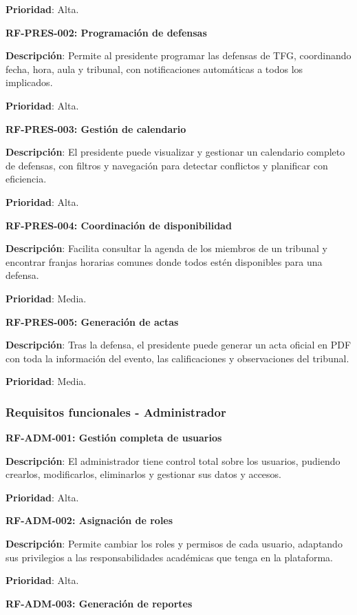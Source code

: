 \documentclass[12pt,a4paper,oneside]{report}
\begin{document}
\textbf{Prioridad}: Alta.

\textbf{RF-PRES-002: Programación de defensas}

\textbf{Descripción}: Permite al presidente programar las defensas de TFG, coordinando fecha, hora, aula y tribunal, con notificaciones automáticas a todos los implicados.

\textbf{Prioridad}: Alta.

\textbf{RF-PRES-003: Gestión de calendario}

\textbf{Descripción}: El presidente puede visualizar y gestionar un calendario completo de defensas, con filtros y navegación para detectar conflictos y planificar con eficiencia.

\textbf{Prioridad}: Alta.

\textbf{RF-PRES-004: Coordinación de disponibilidad}

\textbf{Descripción}: Facilita consultar la agenda de los miembros de un tribunal y encontrar franjas horarias comunes donde todos estén disponibles para una defensa.

\textbf{Prioridad}: Media.

\textbf{RF-PRES-005: Generación de actas}

\textbf{Descripción}: Tras la defensa, el presidente puede generar un acta oficial en PDF con toda la información del evento, las calificaciones y observaciones del tribunal.

\textbf{Prioridad}: Media.

\subsubsection{Requisitos funcionales -
Administrador}\label{requisitos-funcionales---administrador}

\textbf{RF-ADM-001: Gestión completa de usuarios}

\textbf{Descripción}: El administrador tiene control total sobre los usuarios, pudiendo crearlos, modificarlos, eliminarlos y gestionar sus datos y accesos.

\textbf{Prioridad}: Alta.

\textbf{RF-ADM-002: Asignación de roles}

\textbf{Descripción}: Permite cambiar los roles y permisos de cada usuario, adaptando sus privilegios a las responsabilidades académicas que tenga en la plataforma.

\textbf{Prioridad}: Alta.

\textbf{RF-ADM-003: Generación de reportes}
\end{document}

